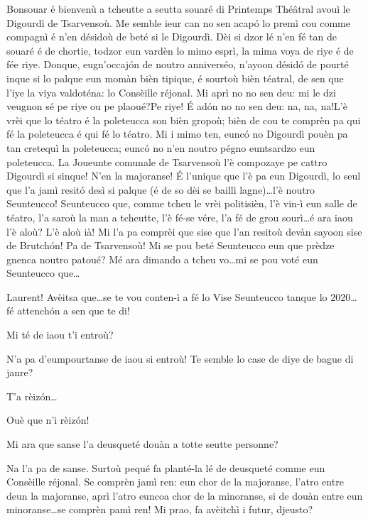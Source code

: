 \begin{drama}

\Laurentspeaks Bonsouar é bienvenù a tcheutte a seutta souaré di Printemps Thé\^atral avouì le Digourdì de Tsarvensoù. Me semble ieur can no sen acapó lo premì cou comme compagnì é n'en désidoù de beté si le Digourdì. Dèi si dzor lé n'en fé tan de souaré é de chortie, todzor eun vardèn lo mimo esprì, la mima voya de riye é de fée riye. Donque, eugn'occajón de noutro anniverséo, n’ayoon désidó de pourté inque si lo palque eun momàn bièn tipique, é sourtoù bièn téatral, de sen que l'iye la viya valdoténa: lo Consèille réjonal. Mi aprì no no sen deu: \og mi le dzi veugnon sé pe riye ou pe plaoué?\fg Pe riye! É ad\'on no no sen deu: \og na, na, na!\fg L'è vrèi que lo téatro é la poleteucca son bièn gropoù; bièn de cou te comprèn pa qui fé la poleteucca é qui fé lo téatro. Mi i mimo ten, euncó no Digourdì pouèn pa tan cretequì la poleteucca; euncó no n'en noutro pégno euntsardzo eun poleteucca. La Joueunte comunale de Tsarvensoù l'è compozaye pe cattro Digourdì si sinque! N'en la majoranse! \'E l'unique que l'è pa eun Digourdì, lo seul que l'a jamì resitó desì si palque (é de so dèi se baillì lagne)\ldots l'è noutro Seunteucco! Seunteucco que, comme tcheu le vrèi politisièn, l'è vin-ì eun salle de téatro, l'a saroù la man a tcheutte, l'è fé-se vére, l'a fé de grou sourì\ldots é ara iaou l'è aloù? L'è aloù ià! Mi l'a pa comprèi que sise que l'an resitoù devàn sayoon sise de Brutchón! Pa de Tsarvensoù! Mi se pou beté Seunteucco eun que prèdze gnenca noutro patoué? Mé ara dimando a tcheu vo\ldots mi se pou voté eun Seunteucco que\ldots


\Ronnyspeaks Laurent! Avèitsa que\ldots se te vou conten-ì a fé lo Vise Seunteucco tanque lo 2020\ldots fé attench\'on a sen que te di!

\Laurentspeaks Mi té de iaou t’i entroù?

\Ronnyspeaks N'a pa d'eumpourtanse de iaou si entroù! Te semble lo case  de diye de bague di janre?

\Laurentspeaks T'a rèiz\'on\ldots

\Ronnyspeaks Ouè que n'i rèiz\'on!

\Laurentspeaks Mi ara que sanse l'a deusqueté douàn a totte seutte personne?

\Ronnyspeaks Na l'a pa de sanse. Surtoù pequé fa planté-la lé de deusqueté comme eun Consèille réjonal. Se comprèn jamì ren: eun chor de la majoranse, l'atro entre deun la majoranse, aprì l'atro euncoa chor de la minoranse, si de douàn entre eun minoranse\ldots se comprèn pamì ren! Mi prao, fa avèitchì i futur, djeusto?


\end{drama}
